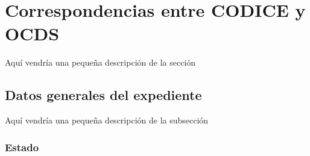 \section{Correspondencias entre CODICE y OCDS}

    Aquí vendría una pequeña descripción de la sección

    \vspace{0.3cm}
    
    \subsection{Datos generales del expediente}
    
    Aquí vendría una pequeña descripción de la subsección
    
        \subsubsection{Estado}
